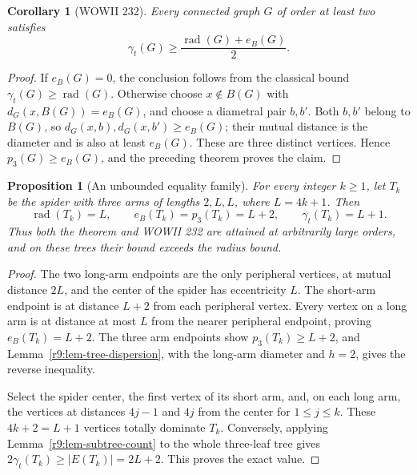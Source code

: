 \documentclass[11pt,a4paper]{article}
\newtheorem{corollary}[theorem]{Corollary}
\newtheorem{proposition}[theorem]{Proposition}
\theoremstyle{remark}
\begin{document}
\begin{corollary}[WOWII 232]\label{r9:cor232}
Every connected graph $G$ of order at least two satisfies
\[
 \gamma_t(G)\ge
 \frac{\operatorname{rad}(G)+e_B(G)}{2}.
\]
\end{corollary}
\begin{proof}
If $e_B(G)=0$, the conclusion follows from the classical bound
$\gamma_t(G)\ge\operatorname{rad}(G)$.
Otherwise choose $x\notin B(G)$ with $d_G(x,B(G))=e_B(G)$,
and choose a diametral pair $b,b'$. Both $b,b'$ belong to $B(G)$,
so $d_G(x,b),d_G(x,b')\ge e_B(G)$; their mutual distance is the
diameter and is also at least $e_B(G)$. These are three distinct
vertices. Hence $p_3(G)\ge e_B(G)$, and the preceding theorem
proves the claim.
\end{proof}

\begin{proposition}[An unbounded equality family]\label{r9:prop232-sharp}
For every integer $k\ge1$, let $T_k$ be the spider with three arms
of lengths $2,L,L$, where $L=4k+1$. Then
\[
 \operatorname{rad}(T_k)=L,\qquad e_B(T_k)=p_3(T_k)=L+2,
 \qquad \gamma_t(T_k)=L+1.
\]
Thus both the theorem and WOWII 232 are attained at arbitrarily large
orders, and on these trees their bound exceeds the radius bound.
\end{proposition}
\begin{proof}
The two long-arm endpoints are the only peripheral vertices, at
mutual distance $2L$, and the center of the spider has eccentricity
$L$. The short-arm endpoint is at distance $L+2$ from each peripheral
vertex. Every vertex on a long arm is at distance at most $L$ from
the nearer peripheral endpoint, proving $e_B(T_k)=L+2$.
The three arm endpoints show $p_3(T_k)\ge L+2$, and
Lemma~\ref{r9:lem-tree-dispersion}, with the long-arm diameter and
$h=2$, gives the reverse inequality.

Select the spider center, the first vertex of its short arm, and,
on each long arm, the vertices at distances $4j-1$ and $4j$ from
the center for $1\le j\le k$. These $4k+2=L+1$ vertices totally
dominate $T_k$. Conversely, applying
Lemma~\ref{r9:lem-subtree-count} to the whole three-leaf tree gives
$2\gamma_t(T_k)\ge |E(T_k)|=2L+2$. This proves the exact value.
\end{proof}

\end{document}
